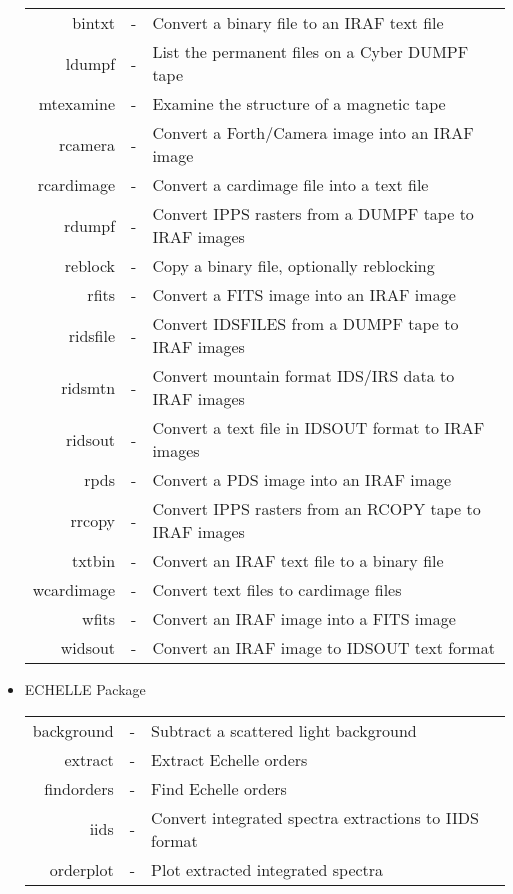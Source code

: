 \begin{itemize}
\begin{tabular}{rcl}
	 bintxt & - & Convert a binary file to an IRAF text file\\
	 ldumpf & - & List the permanent files on a Cyber DUMPF tape\\
      mtexamine & - & Examine the structure of a magnetic tape\\
        rcamera & - & Convert a Forth/Camera image into an IRAF image\\
     rcardimage & - & Convert a cardimage file into a text file\\
	 rdumpf & - & Convert IPPS rasters from a DUMPF tape to IRAF images\\
        reblock & - & Copy a binary file, optionally reblocking\\
          rfits & - & Convert a FITS image into an IRAF image\\
       ridsfile & - & Convert IDSFILES from a DUMPF tape to IRAF images\\
	ridsmtn & - & Convert mountain format IDS/IRS data to IRAF images\\
        ridsout & - & Convert a text file in IDSOUT format to IRAF images\\
           rpds & - & Convert a PDS image into an IRAF image\\
	 rrcopy & - & Convert IPPS rasters from an RCOPY tape to IRAF images\\
	 txtbin & - & Convert an IRAF text file to a binary file\\
     wcardimage & - & Convert text files to cardimage files\\
	  wfits & - & Convert an IRAF image into a FITS image\\
	widsout & - & Convert an IRAF image to IDSOUT text format
\end{tabular}

\item ECHELLE Package \\

\begin{tabular}{rcl}

     background & - & Subtract a scattered light background\\
	extract & - & Extract Echelle orders\\
     findorders & - & Find Echelle orders\\
           iids & - & Convert integrated spectra extractions to IIDS format\\
      orderplot & - & Plot extracted integrated spectra

\end{tabular}
\clearpage


\end{itemize}

